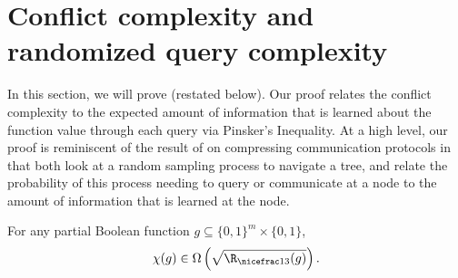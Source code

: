 \documentclass{toc}
\newcommand{\dr}{\nicefrac}
\begin{document}
\section{Conflict complexity and randomized query complexity}
\label{ccnr}
In this section, we will prove  (restated below).  Our proof relates the conflict complexity to the expected amount of information that is learned about the function value through each query via Pinsker's Inequality.
At a high level, our proof is reminiscent of the result of \cite{DBLP:journals/siamcomp/BarakBCR13} on compressing communication protocols in that both look at a random sampling process to navigate a tree, and relate the probability of 
this process needing to query or communicate at a node to the amount of information that is learned at the node.  
\begin{theorem}
\label{mainaStr-restate}
For any partial Boolean function $g \subseteq \{0,1\}^m \times \{0,1\}$,
\[\chi(g)\in\Omega\left(\sqrt{\R_{\dr13}(g)}\right).\]
\end{theorem}
\end{document}
